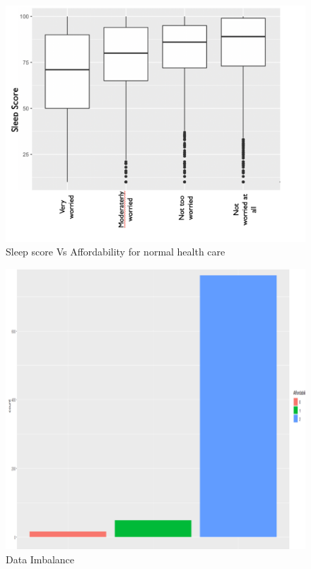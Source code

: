 \documentclass[12pt]{article}
\begin{document}
\begin{figure}[H]
\centering
\includegraphics[scale = 0.4]{sleepHealthCare.png}
\caption{Sleep score Vs Affordability for normal health care}
\label{fig:sleepvshealthcare}
\end{figure}

\begin{figure}[H]
\centering
\includegraphics[scale=0.5]{dataimbalance.png}
\caption{Data Imbalance}
\label{fig:dataimbalance}
\end{figure}
\end{document}
